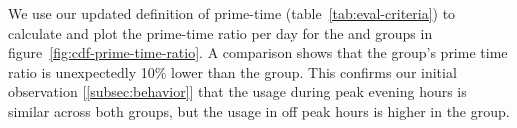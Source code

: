 We use our updated definition of prime-time (table~\ref{tab:eval-criteria}) 
to calculate and plot the prime-time ratio per day for the \treatment{} and
\control{} groups in figure~\ref{fig:cdf-prime-time-ratio}. A comparison shows 
that
the \treatment{} group's prime time ratio is unexpectedly 10\% lower than the 
\control{} group. This confirms our initial observation 
[\autoref{subsec:behavior}]
that the usage during peak evening hours is similar across both groups, but the
usage in off peak hours is higher in the \treatment{} group.



